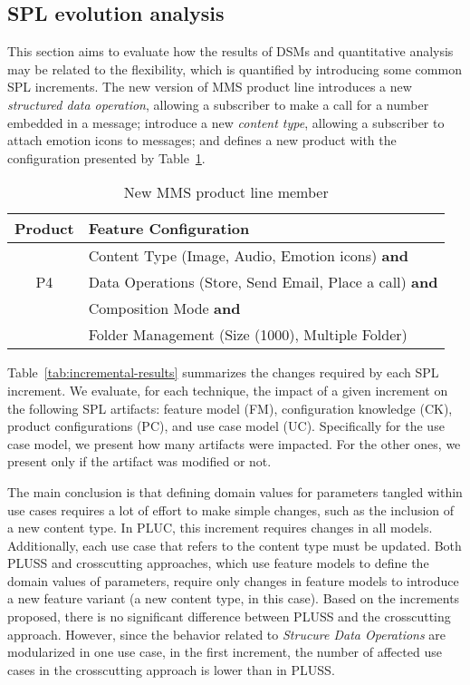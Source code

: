 \documentclass{acm_proc_article-sp}
\begin{document}
\subsection{SPL evolution analysis}
\label{evolution-analysis}

This section aims to evaluate how the results of DSMs and quantitative analysis may be related 
to the flexibility, which is quantified by introducing some common SPL increments. The new version of MMS 
product line introduces a new \emph{structured data operation}, allowing a subscriber to make 
a call for a number embedded in a message;  introduce a new \emph{content type}, allowing a subscriber 
to attach emotion icons to messages; and defines a new product with the configuration presented by Table~\ref{tab:new-product}.

\begin{table}[hb]
\centering
\caption{New MMS product line member}
\label{tab:new-product}
\begin{small}
\begin{tabular}{|c|l|} \hline
Product & Feature Configuration \\ \hline
      & Content Type (Image, Audio, Emotion icons) {\bf and} \\ 
 P4 & Data Operations (Store, Send Email, Place a call) {\bf and}\\
      & Composition Mode {\bf and} \\
      & Folder Management (Size (1000), Multiple Folder)  \\ \hline 
\end{tabular}
\end{small}
\end{table}

Table~\ref{tab:incremental-results} summarizes the changes required by each SPL increment. We evaluate, for each technique, 
the impact of a given increment on  the following SPL artifacts: feature model (FM), configuration knowledge (CK), product configurations (PC), and use case model (UC). Specifically for the use case model, we present how many artifacts were impacted. For the other ones, we present only if the artifact was modified or not. 

The main conclusion is that defining domain values for parameters tangled within use cases requires a lot of effort to make simple 
changes, such as the inclusion of a new content type. In PLUC, this increment requires changes in all models. Additionally, each use 
case that refers to the content type must be updated.  Both PLUSS and crosscutting approaches, which use feature models to define 
the domain values of parameters, require only changes in feature models to introduce a new feature variant (a new content type, in 
this case). Based on the increments proposed, there is no significant difference between PLUSS and the crosscutting approach. However, since the behavior related to \emph{Strucure Data Operations} are modularized in one use case, in the
first increment, the number of affected use cases in the crosscutting approach is lower than in PLUSS. 
\end{document}
